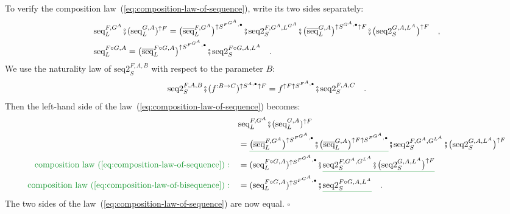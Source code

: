 To verify the composition law~(\ref{eq:composition-law-of-sequence}),
write its two sides separately:
\begin{align*}
 & \text{seq}_{L}^{F,G^{A}}\bef(\text{seq}_{L}^{G,A})^{\uparrow F}=\big(\overline{\text{seq}}_{L}^{F,G^{A}}\big)^{\uparrow S^{F^{G^{A}},\bullet}}\bef\text{seq2}_{S}^{F,G^{A},L^{G^{A}}}\bef\big(\overline{\text{seq}}_{L}^{G,A}\big)^{\uparrow S^{G^{A},\bullet}\uparrow F}\bef\big(\text{seq2}_{S}^{G,A,L^{A}}\big)^{\uparrow F}\quad,\\
 & \text{seq}_{L}^{F\circ G,A}=\big(\overline{\text{seq}}_{L}^{F\circ G,A}\big)^{\uparrow S^{F^{G^{A}},\bullet}}\bef\text{seq2}_{S}^{F\circ G,A,L^{A}}\quad.
\end{align*}
We use the naturality law of $\text{seq2}_{S}^{F,A,B}$ with respect
to the parameter $B$:
\[
\text{seq2}_{S}^{F,A,B}\bef(f^{:B\rightarrow C})^{\uparrow S^{A,\bullet}\uparrow F}=f^{\uparrow F\uparrow S^{F^{A},\bullet}}\bef\text{seq2}_{S}^{F,A,C}\quad.
\]
Then the left-hand side of the law~(\ref{eq:composition-law-of-sequence})
becomes:
\begin{align*}
 & \text{seq}_{L}^{F,G^{A}}\bef(\text{seq}_{L}^{G,A})^{\uparrow F}\\
 & =\gunderline{\big(\overline{\text{seq}}_{L}^{F,G^{A}}\big)^{\uparrow S^{F^{G^{A}},\bullet}}\bef\big(\overline{\text{seq}}_{L}^{G,A}\big)^{\uparrow F\uparrow S^{F^{G^{A}},\bullet}}}\bef\text{seq2}_{S}^{F,G^{A},G^{L^{A}}}\bef\big(\text{seq2}_{S}^{G,A,L^{A}}\big)^{\uparrow F}\\
{\color{greenunder}\text{composition law~(\ref{eq:composition-law-of-sequence})}:}\quad & =(\text{seq}_{L}^{F\circ G,A})^{\uparrow S^{F^{G^{A}},\bullet}}\bef\gunderline{\text{seq2}_{S}^{F,G^{A},G^{L^{A}}}\bef\big(\text{seq2}_{S}^{G,A,L^{A}}\big)^{\uparrow F}}\\
{\color{greenunder}\text{composition law~(\ref{eq:composition-law-of-bisequence})}:}\quad & =(\text{seq}_{L}^{F\circ G,A})^{\uparrow S^{F^{G^{A}},\bullet}}\bef\gunderline{\text{seq2}_{S}^{F\circ G,A,L^{A}}}\quad.
\end{align*}
The two sides of the law~(\ref{eq:composition-law-of-sequence})
are now equal. $\square$

